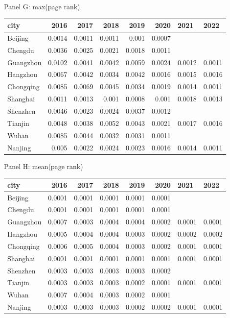 \caption{Panel G: max(page rank)}
\begin{tabular}{lrrrrrll}
\hline
 city      &   2016 &   2017 &   2018 &   2019 &   2020 & 2021   & 2022   \\
\hline
 Beijing   & 0.0014 & 0.0011 & 0.0011 & 0.001  & 0.0007 &        &        \\
 Chengdu   & 0.0036 & 0.0025 & 0.0021 & 0.0018 & 0.0011 &        &        \\
 Guangzhou & 0.0102 & 0.0041 & 0.0042 & 0.0059 & 0.0024 & 0.0012 & 0.0011 \\
 Hangzhou  & 0.0067 & 0.0042 & 0.0034 & 0.0042 & 0.0016 & 0.0015 & 0.0016 \\
 Chongqing & 0.0085 & 0.0069 & 0.0045 & 0.0034 & 0.0019 & 0.0014 & 0.0011 \\
 Shanghai  & 0.0011 & 0.0013 & 0.001  & 0.0008 & 0.001  & 0.0018 & 0.0013 \\
 Shenzhen  & 0.0046 & 0.0023 & 0.0024 & 0.0037 & 0.0012 &        &        \\
 Tianjin   & 0.0048 & 0.0038 & 0.0052 & 0.0043 & 0.0021 & 0.0017 & 0.0016 \\
 Wuhan     & 0.0085 & 0.0044 & 0.0032 & 0.0031 & 0.0011 &        &        \\
 Nanjing   & 0.005  & 0.0022 & 0.0024 & 0.0023 & 0.0016 & 0.0014 & 0.0011 \\
\hline
\end{tabular}

\caption{Panel H: mean(page rank)}
\begin{tabular}{lrrrrrll}
\hline
 city      &   2016 &   2017 &   2018 &   2019 &   2020 & 2021   & 2022   \\
\hline
 Beijing   & 0.0001 & 0.0001 & 0.0001 & 0.0001 & 0.0001 &        &        \\
 Chengdu   & 0.0001 & 0.0001 & 0.0001 & 0.0001 & 0.0001 &        &        \\
 Guangzhou & 0.0007 & 0.0003 & 0.0004 & 0.0004 & 0.0002 & 0.0001 & 0.0001 \\
 Hangzhou  & 0.0005 & 0.0004 & 0.0004 & 0.0003 & 0.0002 & 0.0002 & 0.0002 \\
 Chongqing & 0.0006 & 0.0005 & 0.0004 & 0.0003 & 0.0002 & 0.0001 & 0.0001 \\
 Shanghai  & 0.0001 & 0.0001 & 0.0001 & 0.0001 & 0.0001 & 0.0001 & 0.0001 \\
 Shenzhen  & 0.0003 & 0.0003 & 0.0003 & 0.0003 & 0.0002 &        &        \\
 Tianjin   & 0.0003 & 0.0003 & 0.0003 & 0.0002 & 0.0001 & 0.0001 & 0.0001 \\
 Wuhan     & 0.0007 & 0.0004 & 0.0003 & 0.0002 & 0.0001 &        &        \\
 Nanjing   & 0.0003 & 0.0003 & 0.0003 & 0.0002 & 0.0002 & 0.0001 & 0.0001 \\
\hline
\end{tabular}

